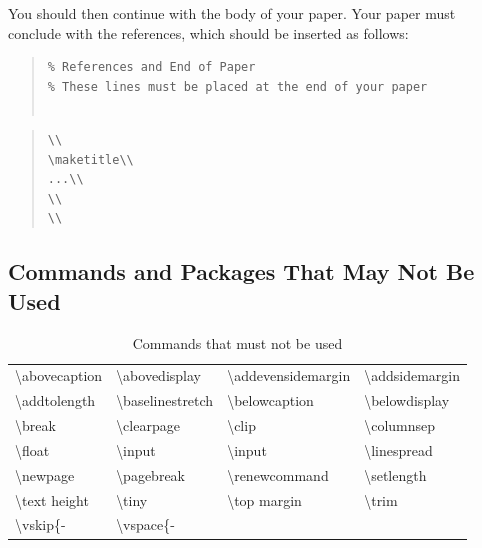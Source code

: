 \noindent You should then continue with the body of your paper. Your paper must conclude with the references, which should be inserted as follows:
\begin{quote}
\begin{scriptsize}\begin{verbatim}
% References and End of Paper
% These lines must be placed at the end of your paper


\end{verbatim}\end{scriptsize}
\end{quote}

\begin{quote}
\begin{scriptsize}\begin{verbatim}
\\
\maketitle\\
...\\
\\
\\
\end{verbatim}\end{scriptsize}
\end{quote}

\subsection{Commands and Packages That May Not Be Used}
\begin{table}[t]
\centering

\begin{tabular}{l|l|l|l}
\textbackslash abovecaption &
\textbackslash abovedisplay &
\textbackslash addevensidemargin &
\textbackslash addsidemargin \\
\textbackslash addtolength &
\textbackslash baselinestretch &
\textbackslash belowcaption &
\textbackslash belowdisplay \\
\textbackslash break &
\textbackslash clearpage &
\textbackslash clip &
\textbackslash columnsep \\
\textbackslash float &
\textbackslash input &
\textbackslash input &
\textbackslash linespread \\
\textbackslash newpage &
\textbackslash pagebreak &
\textbackslash renewcommand &
\textbackslash setlength \\
\textbackslash text height &
\textbackslash tiny &
\textbackslash top margin &
\textbackslash trim \\
\textbackslash vskip\{- &
\textbackslash vspace\{- \\
\end{tabular}
\caption{Commands that must not be used}
\label{table1}
\end{table}

